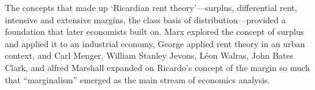 The concepts that made up  `Ricardian rent theory'---surplus, differential rent, intensive and extensive margins, the class basis of distribution---provided a foundation that later economists built on. Marx explored the concept of surplus and applied it  to an industrial economy, George applied rent theory in an urban context, and  Carl Menger, William Stanley Jevons, L\'eon Walras, John Bates Clark, and alfred Marshall expanded on Ricardo's concept of the margin so much that ``marginalism'' emerged as the main stream of economics analysis. 


